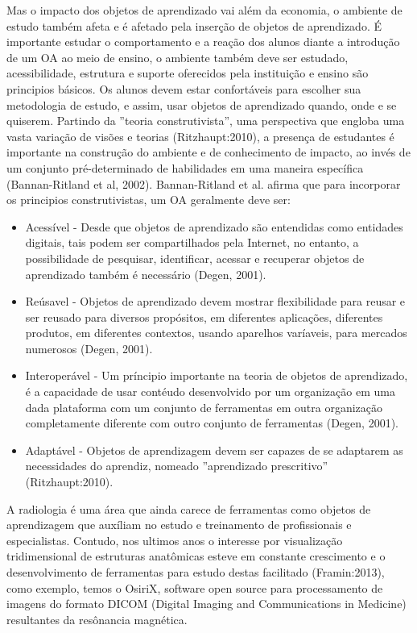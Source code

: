 \documentclass[12pt,openright,oneside,a4paper,english,french,spanish,brazil]{unifil}
\begin{document}
Mas o impacto dos objetos de aprendizado vai além da economia, o ambiente de estudo também afeta e é afetado pela inserção de objetos de aprendizado. É importante estudar o comportamento e a reação dos alunos diante a introdução de um OA ao meio de ensino, o ambiente também deve ser estudado, acessibilidade, estrutura e suporte oferecidos pela instituição e ensino são principios básicos. Os  alunos devem estar confortáveis para escolher sua metodologia de estudo, e assim, usar objetos de aprendizado quando, onde e se quiserem. Partindo da ''teoria construtivista'', uma perspectiva que engloba uma vasta variação de visões e teorias (Ritzhaupt:2010), a presença de estudantes é importante na construção do ambiente e de conhecimento de impacto, ao invés de um conjunto pré-determinado de habilidades em uma maneira específica (Bannan-Ritland et al, 2002). Bannan-Ritland et al. afirma que para incorporar os principios construtivistas, um OA geralmente deve ser:
\begin{itemize}
\item Acessível - Desde que objetos de aprendizado são entendidas como entidades digitais, tais podem ser compartilhados pela Internet, no entanto, a possibilidade de pesquisar, identificar, acessar e recuperar objetos de aprendizado também é necessário (Degen, 2001).
\item Reúsavel - Objetos de aprendizado devem mostrar flexibilidade para reusar e ser reusado para diversos propósitos, em diferentes aplicações, diferentes produtos, em diferentes contextos, usando aparelhos varíaveis, para mercados numerosos (Degen, 2001).
\item Interoperável - Um príncipio importante na teoria de objetos de aprendizado, é a capacidade de usar contéudo desenvolvido por um organização em uma dada plataforma com um conjunto de ferramentas em outra organização completamente diferente com outro conjunto de ferramentas (Degen, 2001).
\item Adaptável - Objetos de aprendizagem devem ser capazes de se adaptarem as necessidades do aprendiz, nomeado ''aprendizado prescritivo'' (Ritzhaupt:2010).
\end{itemize}

A radiologia é uma área que ainda carece de ferramentas como objetos de aprendizagem que auxíliam no estudo e treinamento de profissionais e especialistas. Contudo, nos ultimos anos o interesse por visualização tridimensional de estruturas anatômicas esteve em constante crescimento e o desenvolvimento de ferramentas para estudo destas facilitado (Framin:2013), como exemplo, temos o OsiriX, software open source para processamento de imagens do formato DICOM (Digital Imaging and Communications in Medicine) resultantes da resônancia magnética. 
\end{document}
